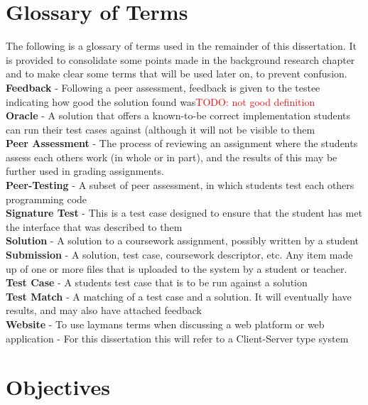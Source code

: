 \documentclass[a4paper,11pt]{report}
\newcommand{\todo}[1]{\textcolor{red}{TODO: #1}}
\newcommand{\gloss}[2]{\textbf{#1} - {#2}\\}
\begin{document}
\chapter{Glossary of Terms}
The following is a glossary of terms used in the remainder of this dissertation. It is provided to consolidate some points made in the background research chapter and to make clear some terms that will be used later on, to prevent confusion.\\
\gloss{Feedback}{Following a peer assessment, feedback is given to the testee indicating how good the solution found was\todo{not good definition}}
\gloss{Oracle}{A solution that offers a known-to-be correct implementation students can run their test cases against (although it will not be visible to them}
\gloss{Peer Assessment}{The process of reviewing an assignment where the students assess each others work (in whole or in part), and the results of this may be further used in grading assignments.}
\gloss{Peer-Testing}{A subset of peer assessment, in which students test each others programming code}
\gloss{Signature Test}{This is a test case designed to ensure that the student has met the interface that was described to them}
\gloss{Solution}{A solution to a coursework assignment, possibly written by a student}
\gloss{Submission}{A solution, test case, coursework descriptor, etc. Any item made up of one or more files that is uploaded to the system by a student or teacher.}
\gloss{Test Case}{A students test case that is to be run against a solution}
\gloss{Test Match}{A matching of a test case and a solution. It will eventually have results, and may also have attached feedback}
\gloss{Website}{To use laymans terms when discussing a web platform or web application - For this dissertation this will refer to a Client-Server type system}


\chapter{Objectives}
\end{document}
